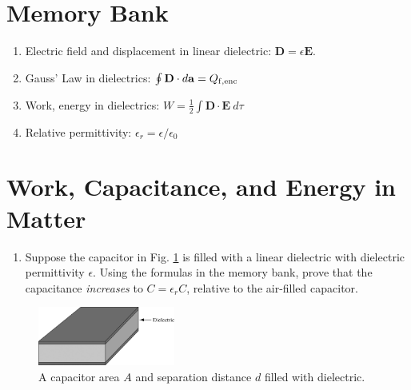 \documentclass[12pt]{article}
\begin{document}
\maketitle
\small
\section{Memory Bank}
\begin{enumerate}
\item Electric field and displacement in linear dielectric: $\mathbf{D} = \epsilon \mathbf{E}$.
\item Gauss' Law in dielectrics: $\oint \mathbf{D} \cdot d\mathbf{a} = Q_{\rm f, enc}$
\item Work, energy in dielectrics: $W = \frac{1}{2}\int \mathbf{D} \cdot \mathbf{E} ~ d\tau$
\item Relative permittivity: $\epsilon_r = \epsilon / \epsilon_0$
\end{enumerate}

\section{Work, Capacitance, and Energy in Matter}

\begin{enumerate}
\item Suppose the capacitor in Fig. \ref{fig:1} is filled with a linear dielectric with dielectric permittivity $\epsilon$.  Using the formulas in the memory bank, prove that the capacitance \textit{increases} to $C = \epsilon_r C$, relative to the air-filled capacitor.
\end{enumerate}

\begin{figure}
\centering
\includegraphics[width=0.4\textwidth]{figures/4_23.jpg}
\caption{\label{fig:1} A capacitor area $A$ and separation distance $d$ filled with dielectric.}
\end{figure}
\end{document}
